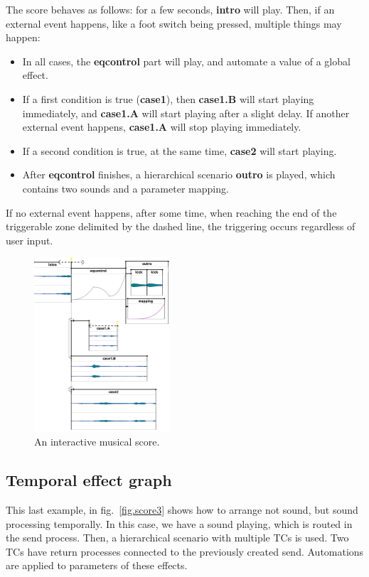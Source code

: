 \documentclass{article}
\newcommand*{\timeconstraints}{\acp{TC}\xspace}
\begin{document}
The score behaves as follows: 
for a few seconds, \textbf{intro} will play.  
Then, if an external event happens, like a foot switch being pressed, 
multiple things may happen: 
\begin{itemize}
    \item In all cases, the \textbf{eqcontrol} part will play, and automate a value of a global effect.
    \item If a first condition is true (\textbf{case1}), then \textbf{case1.B} will start playing immediately, and \textbf{case1.A} will start playing after a slight delay. If another external event happens, \textbf{case1.A} will stop playing immediately.
    \item If a second condition is true, at the same time, \textbf{case2} will start playing.
    \item After \textbf{eqcontrol} finishes, a hierarchical scenario \textbf{outro} is played, which contains two sounds and a parameter mapping.
\end{itemize}
If no external event happens, after some time, when reaching the end of the triggerable zone delimited by the dashed line, the triggering occurs regardless of user input.

\begin{figure}[h]
    \centering
    \includegraphics[width=0.45\textwidth]{figures/ex2.png}
    \caption{An interactive musical score.}
    \label{fig.score2}
\end{figure}

\subsection{Temporal effect graph}
This last example, in fig.~\ref{fig.score3} shows how to arrange not sound, but sound processing temporally.
In this case, we have a sound playing, which is routed in the send process.
Then, a hierarchical scenario with multiple \timeconstraints is used. Two \timeconstraints have return processes connected to the previously created send.
Automations are applied to parameters of these effects.
\end{document}
